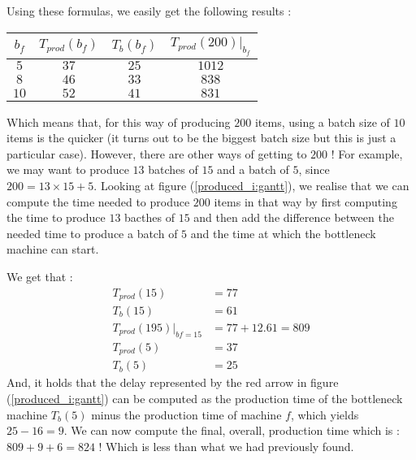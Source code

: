 Using these formulas, we easily get the following results : \begin{center}
    \begin{tabular}{|c|c|c|c|}
        \hline
        $b_f$ & $T_{prod}(b_f)$ & $T_b(b_f)$ & $T_{prod}(200)|_{b_f}$\\\hline
        $5$ & $37$ & $25$ & $1012$ \\\hline
        $8$ & $46$ & $33$ & $838$ \\\hline
        $10$ & $52$ & $41$ & $831$ \\\hline
    \end{tabular}
\end{center} Which means that, for this way of producing $200$ items, using a batch size of $10$ items is the quicker (it turns out to be the biggest batch size but this is just a particular case). However, there are other ways of getting to $200$ ! For example, we may want to produce $13$ batches of $15$ and a batch of $5$, since $200 = 13\times 15 + 5$. Looking at figure (\ref{produced_i:gantt}), we realise that we can compute the time needed to produce $200$ items in that way by first computing the time to produce $13$ bacthes of $15$ and then add the difference between the needed time to produce a batch of $5$ and the time at which the bottleneck machine can start.

We get that : \[
    \begin{split}
        T_{prod}(15) &= 77\\
        T_b(15) &= 61\\
        T_{prod}(195)|_{bf=15} &= 77 + 12.61 = 809\\
        T_{prod}(5) &= 37\\
        T_b(5) &= 25
    \end{split}
\] And, it holds that the delay represented by the red arrow in figure (\ref{produced_i:gantt}) can be computed as the production time of the bottleneck machine $T_b(5)$ minus the production time of machine $f$, which yields $25 - 16 = 9$. We can now compute the final, overall, production time which is : $809 + 9 + 6 = 824$ ! Which is less than what we had previously found. 

